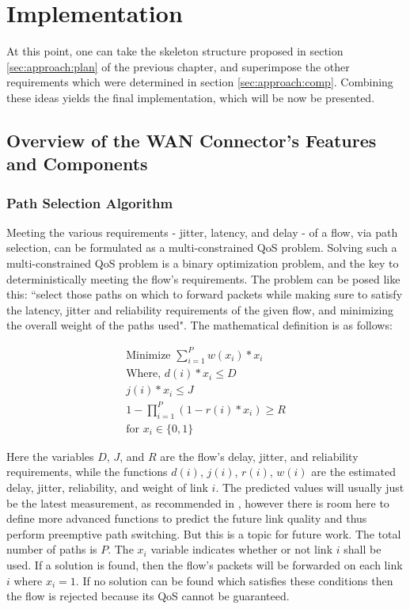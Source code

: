 \chapter{Implementation}
\label{cha:impl}

At this point, one can take the skeleton structure proposed in section \ref{sec:approach:plan} of the previous chapter, and superimpose the other requirements which were determined in section \ref{sec:approach:comp}. Combining these ideas yields the final implementation, which will be now be presented.


\section{Overview of the WAN Connector's Features and Components}
\label{sec:approach:arch}

\subsection{Path Selection Algorithm}

Meeting the various requirements - jitter, latency, and delay - of a flow, via path selection, can be formulated as a multi-constrained QoS problem. Solving such a multi-constrained QoS problem is a binary optimization problem, and the key to deterministically meeting the flow's requirements. The problem can be posed like this: “select those paths on which to forward packets while making sure to satisfy the latency, jitter and reliability requirements of the given flow, and minimizing the overall weight of the paths used". The mathematical definition is as follows:

\begin{gather}
\label{algorithm}
\text{Minimize } \sum_{i=1}^{P}w(x_i) * x_i \\
\text{Where,   } d(i) * x_i\le D \\
j(i) * x_i \le J \\
1 - \prod_{i=1}^{P}{ ( 1- r(i) * x_i ) } \ge R  \\
\text{for } x_i \in \{0,1\}
\end{gather}

Here the variables $D$, $J$, and $R$ are the flow's delay, jitter, and reliability requirements, while the functions $d(i)$, $j(i)$, $r(i)$, $w(i)$ are the estimated delay, jitter, reliability, and weight of link $i$. The predicted values will usually just be the latest measurement, as recommended in \cite{akella2008performance}, however there is room here to define more advanced functions to predict the future link quality and thus perform preemptive path switching. But this is a topic for future work. The total number of paths is $P$. The $x_i$ variable indicates whether or not link $i$ shall be used. If a solution is found, then the flow's packets will be forwarded on each link $i$ where $x_i = 1$. If no solution can be found which satisfies these conditions then the flow is rejected because its QoS cannot be guaranteed.

